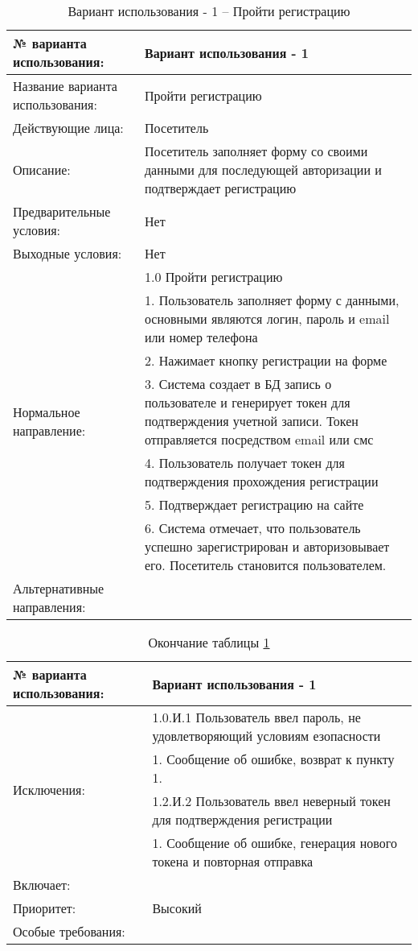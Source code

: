 \begin{table}[H]
  \caption{\onehalfspacing Вариант использования - 1 – Пройти регистрацию}\label{use-case-1-table}
  \begin{tabular}{|p{6cm}|p{10cm}|}
  \hline № варианта использования: & Вариант использования - 1 \\
  \hline Название варианта использования: & Пройти регистрацию \\
  \hline Действующие лица: & Посетитель \\
  \hline Описание: & Посетитель заполняет форму со своими данными для последующей авторизации и подтверждает регистрацию \\
  \hline Предварительные условия: & Нет \\
  \hline Выходные условия: & Нет \\
  \hline \multirow{7}{*}{Нормальное направление:} & 1.0  Пройти регистрацию \\
  \cline{2-2} & 1. Пользователь заполняет форму с данными, основными являются логин, пароль и email или номер телефона \\
  \cline{2-2} & 2. Нажимает кнопку регистрации на форме \\
  \cline{2-2} & 3. Система создает в БД запись о пользователе и генерирует токен для подтверждения учетной записи. Токен отправляется посредством email или смс \\
  \cline{2-2} & 4. Пользователь получает токен для подтверждения прохождения регистрации \\
  \cline{2-2} & 5. Подтверждает регистрацию на сайте \\
  \cline{2-2} & 6. Система отмечает, что пользователь успешно зарегистрирован и авторизовывает его. Посетитель становится пользователем. \\
  \hline Альтернативные направления: &  \\
  \end{tabular}
\end{table}
\begin{table}[H]
  \caption*{Окончание таблицы \ref{use-case-1-table}}
  \begin{tabular}{|p{6cm}|p{10cm}|}
  \hline № варианта использования: & Вариант использования - 1 \\
  \hline \multirow{4}{*}{Исключения:} & 1.0.И.1 Пользователь ввел пароль, не удовлетворяющий условиям езопасности \\
  \cline{2-2} & 1. Сообщение об ошибке, возврат к пункту 1. \\
  \cline{2-2} & 1.2.И.2 Пользователь ввел неверный токен для подтверждения регистрации \\
  \cline{2-2} & 1. Сообщение об ошибке, генерация нового токена и повторная отправка \\
  \hline Включает: &  \\
  \hline Приоритет: & Высокий \\
  \hline Особые требования: &  \\
  \hline
  \end{tabular}
\end{table}


